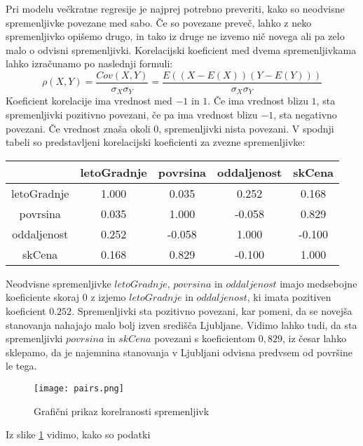 \documentclass[a4paper, 12pt]{article}
\begin{document}
Pri modelu večkratne regresije je najprej potrebno preveriti, kako so
neodvisne spremenljivke povezane med sabo. Če so povezane preveč, lahko z neko
spremenljivko opišemo drugo, in tako iz druge ne izvemo nič novega ali pa zelo
malo o odvisni spremenljivki. Korelacijski koeficient med dvema spremenljivkama
lahko izračunamo po naslednji formuli:
\begin{equation}
	\rho\left(X,Y\right) = \frac{Cov\left(X,Y\right)}{\sigma_{X}\sigma_{Y}} =
	\frac{E\left(\left(X-E\left(X\right)\right)\left(Y-E\left(Y\right)\right)\right)}{\sigma_{X}\sigma_{Y}}
\end{equation}
Koeficient korelacije ima vrednost med $ -1 $ in $ 1 $. Če ima vrednost blizu
$ 1 $, sta spremenljivki pozitivno povezani, če pa ima vrednost blizu $ -1 $,
sta negativno povezani. Če vrednost znaša okoli $ 0 $, spremenljivki nista
povezani.
\newline
V spodnji tabeli so predstavljeni korelacijski koeficienti za zvezne
spremenljivke:
\begin{center}
\begin{tabular}{ c|cccc }
	& letoGradnje & povrsina & oddaljenost & skCena \\
	\hline
	letoGradnje & 1.000 & 0.035 & 0.252 & 0.168 \\
	povrsina & 0.035 & 1.000 & -0.058 & 0.829 \\
	oddaljenost & 0.252 & -0.058 & 1.000 & -0.100 \\
	skCena & 0.168 & 0.829 & -0.100 & 1.000 \\
\end{tabular}
\end{center}

Neodvisne spremenljivke $ letoGradnje $, $ povrsina $ in
$ oddaljenost $ imajo medsebojne koeficiente skoraj $ 0 $ z izjemo
$ letoGradnje $ in $ oddaljenost $, ki imata pozitiven koeficient
$ 0.252 $. Spremenljivki sta pozitivno povezani, kar pomeni, da se novejša
stanovanja nahajajo malo bolj izven središča Ljubljane. Vidimo lahko tudi, da
sta spremenljivki $ povrsina $ in $ skCena $ povezani s koeficientom $ 0,829 $,
iz česar lahko sklepamo, da je najemnina stanovanja v Ljubljani odvisna
predvsem od površine le tega.

\begin{figure}[H]
	\centering
	\texttt{[image: pairs.png]}
	\caption{Grafični prikaz korelranosti spremenljivk}
	\label{figure:2}
\end{figure}

Iz slike \ref{figure:2} vidimo, kako so podatki 
\end{document}
